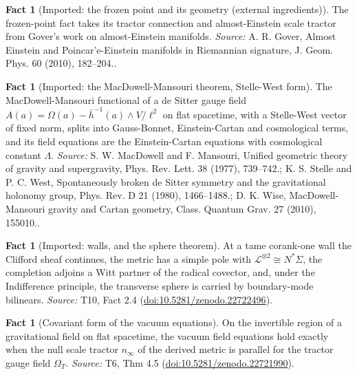 \documentclass[11pt]{article}
\theoremstyle{definition}
\newtheorem{fact}[theorem]{Fact}
\theoremstyle{plain}
\providecommand{\hb}{}\renewcommand{\hb}{\bar{h}}
\providecommand{\nInf}{}\renewcommand{\nInf}{n_\infty}
\begin{document}
\begin{fact}[Imported: the frozen point and its geometry (external ingredients)]\label{c:dark-energy.imported-frozen-point-geometry-external}
The frozen-point fact takes its tractor connection and almost-Einstein scale tractor from Gover's work on almost-Einstein manifolds.
\emph{Source:} A. R. Gover, Almost Einstein and Poincar'e-Einstein manifolds in Riemannian signature, J. Geom. Phys. 60 (2010), 182--204..
\end{fact}

\begin{fact}[Imported: the MacDowell-Mansouri theorem, Stelle-West form]\label{c:dark-energy.imported-macdowell-mansouri-theorem-stelle-west}
The MacDowell-Mansouri functional of a de Sitter gauge field $A(a) = \Omega(a) - \hb^{-1}(a)\wedge V/\ell^2$ on flat spacetime, with a Stelle-West vector of fixed norm, splits into Gauss-Bonnet, Einstein-Cartan and cosmological terms, and its field equations are the Einstein-Cartan equations with cosmological constant $\Lambda$.
\emph{Source:} S. W. MacDowell and F. Mansouri, Unified geometric theory of gravity and supergravity, Phys. Rev. Lett. 38 (1977), 739--742.; K. S. Stelle and P. C. West, Spontaneously broken de Sitter symmetry and the gravitational holonomy group, Phys. Rev. D 21 (1980), 1466--1488.; D. K. Wise, MacDowell-Mansouri gravity and Cartan geometry, Class. Quantum Grav. 27 (2010), 155010..
\end{fact}

\begin{fact}[Imported: walls, and the sphere theorem]\label{c:dark-energy.imported-walls-sphere-theorem}
At a tame corank-one wall the Clifford sheaf continues, the metric has a simple pole with $\mathcal{L}^{\otimes 2} \cong N^*\Sigma$, the completion adjoins a Witt partner of the radical covector, and, under the Indifference principle, the transverse sphere is carried by boundary-mode bilinears.
\emph{Source:} T10, Fact 2.4 (\href{https://doi.org/10.5281/zenodo.22722496}{doi:10.5281/zenodo.22722496}).
\end{fact}

\begin{fact}[Covariant form of the vacuum equations]\label{c:interior.covariant-form-vacuum-equations}
On the invertible region of a gravitational field on flat spacetime, the vacuum field equations hold exactly when the null scale tractor $\nInf$ of the derived metric is parallel for the tractor gauge field $\Omega_{T}$.
\emph{Source:} T6, Thm 4.5 (\href{https://doi.org/10.5281/zenodo.22721990}{doi:10.5281/zenodo.22721990}).
\end{fact}
\end{document}
